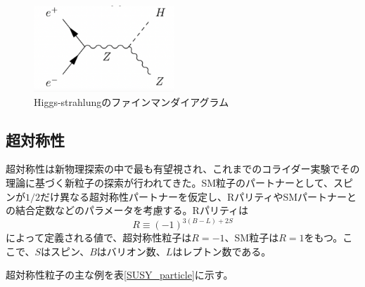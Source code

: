\begin{figure}[h]
	\begin{center}
		\includegraphics[width=150pt]{./Figure/Introduction/eeZZH.png}
		\caption[Higgs-strahlungのファインマンダイアグラム]{Higgs-strahlungのファインマンダイアグラム}
		\label{Higgs}
	\end{center}
\end{figure}

\subsection{超対称性}
超対称性は新物理探索の中で最も有望視され、これまでのコライダー実験でその理論に基づく新粒子の探索が行われてきた。SM粒子のパートナーとして、スピンが$1/2$だけ異なる超対称性パートナーを仮定し、RパリティやSMパートナーとの結合定数などのパラメータを考慮する。Rパリティは
\[
R\equiv(-1)^{3(B-L)+2S}
\]
によって定義される値で、超対称性粒子は$R=-1$、SM粒子は$R=1$をもつ。ここで、$S$はスピン、$B$はバリオン数、$L$はレプトン数である。

超対称性粒子の主な例を表\ref{SUSY_particle}に示す。%

